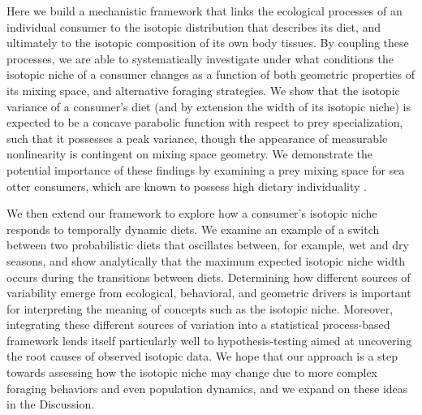 \documentclass{frontiersSCNS}
\begin{document}
Here we build a mechanistic framework that links the ecological processes of  an individual consumer to the isotopic distribution that describes its diet, and ultimately to the isotopic composition of its own body tissues.
By coupling these processes, we are able to systematically investigate under what conditions the isotopic niche of a consumer changes as a function of both geometric properties of its mixing space, and alternative foraging strategies.
We show that the isotopic variance of a consumer's diet (and by extension the width of its isotopic niche) is expected to be a concave parabolic function with respect to prey specialization, such that it possesses a peak variance, though the appearance of measurable nonlinearity is contingent on mixing space geometry.
We demonstrate the potential importance of these findings by examining a prey mixing space for sea otter consumers, which are known to possess high dietary individuality \citep{Tinker:2008tp,Newsome:2015gy}.

We then extend our framework to explore how a consumer's isotopic niche responds to temporally dynamic diets.
We examine an example of a switch between two probabilistic diets that oscillates between, for example, wet and dry seasons, and show analytically that the maximum expected isotopic niche width occurs during the transitions between diets.
Determining how different sources of variability emerge from ecological, behavioral, and geometric drivers is important for interpreting the meaning of concepts such as the isotopic niche.
Moreover, integrating these different sources of variation into a statistical process-based framework lends itself particularly well to hypothesis-testing aimed at uncovering the root causes of observed isotopic data.
We hope that our approach is a step towards assessing how the isotopic niche may change due to more complex foraging behaviors and even population dynamics, and we expand on these ideas in the Discussion.



%
\end{document}
